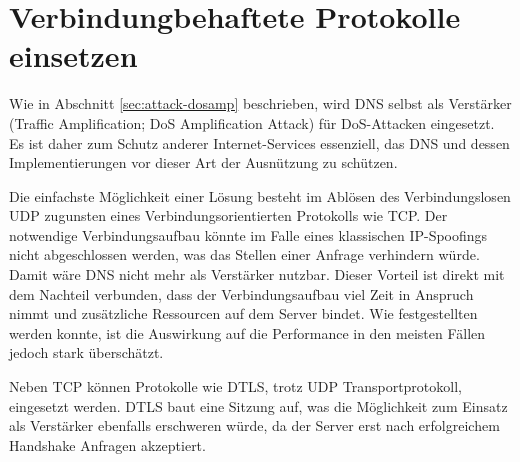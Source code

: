 \section{Verbindungbehaftete Protokolle einsetzen}
\label{sec:goals-trafficamp}
Wie in Abschnitt \ref{sec:attack-dosamp} beschrieben, wird DNS selbst als Verstärker (Traffic Amplification; DoS Amplification Attack) für DoS-Attacken eingesetzt. Es ist daher zum Schutz anderer Internet-Services essenziell, das DNS und dessen Implementierungen vor dieser Art der Ausnützung zu schützen.

Die einfachste Möglichkeit einer Lösung besteht im Ablösen des Verbindungslosen UDP zugunsten eines Verbindungsorientierten Protokolls wie TCP. Der notwendige Verbindungsaufbau könnte im Falle eines klassischen IP-Spoofings nicht abgeschlossen werden, was das Stellen einer Anfrage verhindern würde. Damit wäre DNS nicht mehr als Verstärker nutzbar. Dieser Vorteil ist direkt mit dem Nachteil verbunden, dass der Verbindungsaufbau viel Zeit in Anspruch nimmt und zusätzliche Ressourcen auf dem Server bindet. Wie festgestellten werden konnte, ist die Auswirkung auf die Performance in den meisten Fällen jedoch stark überschätzt\cite{Zhu2015}.

Neben TCP können Protokolle wie DTLS, trotz UDP Transportprotokoll, eingesetzt werden. DTLS baut eine Sitzung auf, was die Möglichkeit zum Einsatz als Verstärker ebenfalls erschweren würde, da der Server erst nach erfolgreichem Handshake Anfragen akzeptiert\cite{rfc6347}. 
